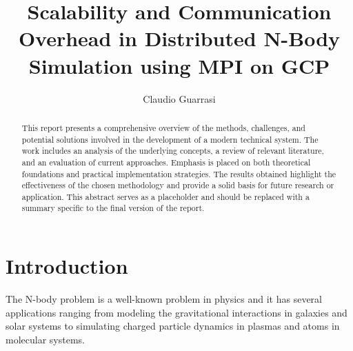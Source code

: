 \documentclass{article}
\title{\textbf{Scalability and Communication Overhead in Distributed N-Body Simulation using MPI on GCP}\\}
\author{Claudio Guarrasi\\[1ex]}
\date{%
	\today
	\vspace{-0.25cm}
	\\
	\rule{\textwidth}{0.3pt}}
\begin{document}
\begin{titlingpage}

\maketitle %
\thispagestyle{empty} %

	\begin{multicols*}{2}

		\begin{abstract}
			\centering
			\noindent
			This report presents a comprehensive overview of the methods, challenges, and potential solutions involved in the development of a modern technical system. The work includes an analysis of the underlying concepts, a review of relevant literature, and an evaluation of current approaches. Emphasis is placed on both theoretical foundations and practical implementation strategies. The results obtained highlight the effectiveness of the chosen methodology and provide a solid basis for future research or application. This abstract serves as a placeholder and should be replaced with a summary specific to the final version of the report.
		\end{abstract}
	\newcolumn
		\centering
		\noindent
		\tableofcontents
	\end{multicols*}
\end{titlingpage}

\thispagestyle{plain}

\twocolumn

\section{Introduction}
The N-body problem is a well-known problem in physics and it has several applications ranging from modeling the gravitational interactions in galaxies and solar systems to simulating charged particle dynamics in plasmas and atoms in molecular systems.
\end{document}

